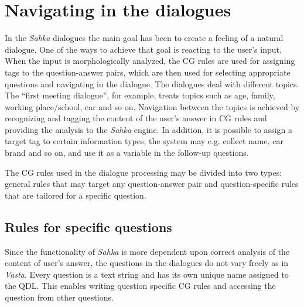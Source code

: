 \documentclass[11pt]{article}
\begin{document}
\section{Navigating in the dialogues}

In the \textit{Sahka} dialogues the main goal has been to create a feeling of a natural dialogue. One of the ways to achieve that goal is reacting to the user's input. When the input is morphologically analyzed, the CG rules are used for assigning tags to the question-answer pairs, which are then used for selecting appropriate questions and navigating in the dialogue. The dialogues deal with different topics. The “first meeting dialogue”, for example, treats topics such as age, family, working place/school, car and so on. Navigation between the topics is achieved by recognizing and tagging the content of the user's answer in CG rules and providing the analysis to the \textit{Sahka}-engine.  In addition, it is possible to assign a target tag to certain information types; the system may e.g. collect name, car brand and so on, and use it as a variable in the follow-up questions. 

The CG rules used in the dialogue processing may be divided into two types: general rules that may target any question-answer pair and question-specific rules that are tailored for a specific question. %


\subsection{Rules for specific questions}
Since the functionality of \textit{Sahka} is more dependent upon correct analysis of the content of user's answer, the questions in the dialogues do not vary freely as in \textit{Vasta}. Every question is a text string and has its own unique name assigned to the QDL.  This enables writing question specific CG rules and accessing the question from other questions. \\ 
\end{document}
